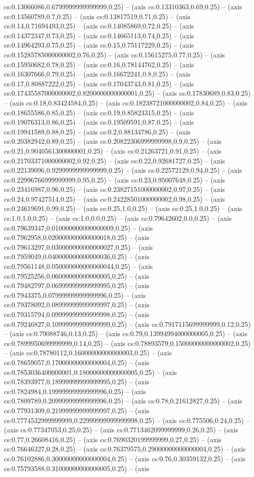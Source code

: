 cs:0.13066086,0.6799999999999999,0.25) -- (axis cs:0.13310363,0.69,0.25) -- (axis cs:0.13560789,0.7,0.25) -- (axis cs:0.13817519,0.71,0.25) -- (axis cs:0.14,0.71694493,0.25) -- (axis cs:0.14085869,0.72,0.25) -- (axis cs:0.14372347,0.73,0.25) -- (axis cs:0.14665113,0.74,0.25) -- (axis cs:0.14964293,0.75,0.25) -- (axis cs:0.15,0.75117229,0.25) -- (axis cs:0.15285785000000002,0.76,0.25) -- (axis cs:0.15615275,0.77,0.25) -- (axis cs:0.15950682,0.78,0.25) -- (axis cs:0.16,0.78144762,0.25) -- (axis cs:0.16307666,0.79,0.25) -- (axis cs:0.16672241,0.8,0.25) -- (axis cs:0.17,0.80887222,0.25) -- (axis cs:0.17043743,0.81,0.25) -- (axis cs:0.17435587000000002,0.8200000000000001,0.25) -- (axis cs:0.17830689,0.83,0.25) -- (axis cs:0.18,0.83424584,0.25) -- (axis cs:0.18238721000000002,0.84,0.25) -- (axis cs:0.18655586,0.85,0.25) -- (axis cs:0.19,0.85823315,0.25) -- (axis cs:0.19076313,0.86,0.25) -- (axis cs:0.19509591,0.87,0.25) -- (axis cs:0.19941589,0.88,0.25) -- (axis cs:0.2,0.88134786,0.25) -- (axis cs:0.20382942,0.89,0.25) -- (axis cs:0.20822306999999998,0.9,0.25) -- (axis cs:0.21,0.9040561300000001,0.25) -- (axis cs:0.21263721,0.91,0.25) -- (axis cs:0.21703371000000002,0.92,0.25) -- (axis cs:0.22,0.92681727,0.25) -- (axis cs:0.22139096,0.9299999999999999,0.25) -- (axis cs:0.22572129,0.94,0.25) -- (axis cs:0.22996766999999999,0.95,0.25) -- (axis cs:0.23,0.95007648,0.25) -- (axis cs:0.23416987,0.96,0.25) -- (axis cs:0.23827151000000002,0.97,0.25) -- (axis cs:0.24,0.97427514,0.25) -- (axis cs:0.24228501000000002,0.98,0.25) -- (axis cs:0.24619691,0.99,0.25) -- (axis cs:0.25,1.0,0.25) -- (axis cs:0.25,1.0,0.25) -- (axis cs:1.0,1.0,0.25) -- (axis cs:1.0,0.0,0.25) -- (axis cs:0.79642602,0.0,0.25) -- (axis cs:0.79639347,0.010000000000000009,0.25) -- (axis cs:0.7962958,0.020000000000000018,0.25) -- (axis cs:0.79613297,0.030000000000000027,0.25) -- (axis cs:0.7959049,0.040000000000000036,0.25) -- (axis cs:0.79561148,0.050000000000000044,0.25) -- (axis cs:0.79525256,0.06000000000000005,0.25) -- (axis cs:0.79482797,0.06999999999999995,0.25) -- (axis cs:0.7943375,0.07999999999999996,0.25) -- (axis cs:0.79378092,0.08999999999999997,0.25) -- (axis cs:0.79315794,0.09999999999999998,0.25) -- (axis cs:0.79246827,0.10999999999999999,0.25) -- (axis cs:0.7917115699999999,0.12,0.25) -- (axis cs:0.79088746,0.13,0.25) -- (axis cs:0.79,0.13994994000000005,0.25) -- (axis cs:0.7899950699999999,0.14,0.25) -- (axis cs:0.78893579,0.15000000000000002,0.25) -- (axis cs:0.78780112,0.16000000000000003,0.25) -- (axis cs:0.78659057,0.17000000000000004,0.25) -- (axis cs:0.7853036400000001,0.18000000000000005,0.25) -- (axis cs:0.78393977,0.18999999999999995,0.25) -- (axis cs:0.7824984,0.19999999999999996,0.25) -- (axis cs:0.7809789,0.20999999999999996,0.25) -- (axis cs:0.78,0.21612827,0.25) -- (axis cs:0.77931309,0.21999999999999997,0.25) -- (axis cs:0.7774532999999999,0.22999999999999998,0.25) -- (axis cs:0.775506,0.24,0.25) -- (axis cs:0.77347053,0.25,0.25) -- (axis cs:0.7713462099999999,0.26,0.25) -- (axis cs:0.77,0.26608416,0.25) -- (axis cs:0.7690320199999999,0.27,0.25) -- (axis cs:0.76646327,0.28,0.25) -- (axis cs:0.76379575,0.29000000000000004,0.25) -- (axis cs:0.76102886,0.30000000000000004,0.25) -- (axis cs:0.76,0.30359132,0.25) -- (axis cs:0.75793588,0.31000000000000005,0.25) -- (axis 